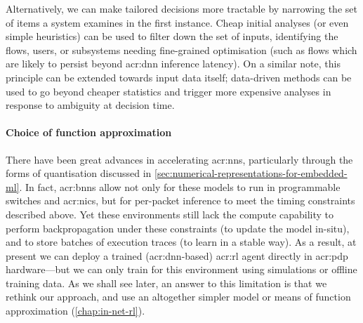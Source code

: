 Alternatively, we can make tailored decisions more tractable by narrowing the set of items a system examines in the first instance.
Cheap initial analyses (or even simple heuristics) can be used to filter down the set of inputs, identifying the flows, users, or subsystems needing fine-grained optimisation (such as flows which are likely to persist beyond \gls{acr:dnn} inference latency).
On a similar note, this principle can be extended towards input data itself; data-driven methods can be used to go beyond cheaper statistics and trigger more expensive analyses in response to ambiguity at decision time.

\paragraph{Choice of function approximation}
There have been great advances in accelerating \glspl{acr:nn}, particularly through the forms of quantisation discussed in \cref{sec:numerical-representations-for-embedded-ml}.
In fact, \glspl{acr:bnn} allow not only for these models to run in programmable switches and \glspl{acr:nic}, but for per-packet inference to meet the timing constraints described above.
Yet these environments still lack the compute capability to perform backpropagation under these constraints (to update the model in-situ), and to store batches of execution traces (to learn in a stable way).
As a result, at present we can deploy a trained (\gls{acr:dnn}-based) \gls{acr:rl} agent directly in \gls{acr:pdp} hardware---but we can only train for this environment using simulations or offline training data.
As we shall see later, an answer to this limitation is that we rethink our approach, and use an altogether simpler model or means of function approximation (\cref{chap:in-net-rl}).

%
%
%
%


